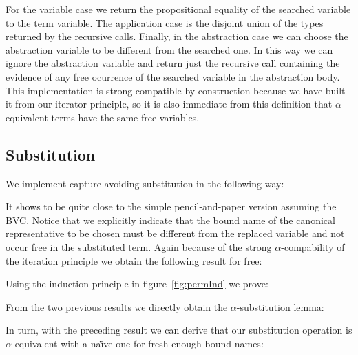 \documentclass{entcs}
\newcommand{\alp}{\ensuremath{\alpha}}
\begin{document}
 \hspace{5px}

\noindent For the variable case we return the propositional equality of the searched variable to the term variable. The application case is the disjoint union of the types returned by the recursive calls. Finally, in the abstraction case we can choose the abstraction variable to be different from the searched one. In this way we can ignore the abstraction variable and return just the recursive call containing the evidence of any free ocurrence of the searched variable in the abstraction body. 
This implementation is strong compatible by construction because we have built it from our iterator principle, so it is also immediate from this definition that $\alpha$-equivalent terms have the same free variables.


\subsection{Substitution}
\label{subst}

We implement capture avoiding substitution in the following way:

 \hspace{5px}

It shows to be quite close to the simple pencil-and-paper version assuming the BVC. Notice that we explicitly indicate that the bound name of the canonical representative to be chosen must be different from the replaced variable and not occur free in the substituted term.
Again because of the strong \alp-compability of the iteration principle we obtain the following result for free:

 \hspace{5px}

Using the induction principle in figure~\ref{fig:permInd} we prove:

 \hspace{5px}

From the two previous results we directly obtain the \alp-substitution lemma:

 \hspace{5px}

In turn, with the preceding result we can derive that our substitution operation is \alp-equivalent with a na\"\i ve one for fresh enough bound names:
\end{document}
